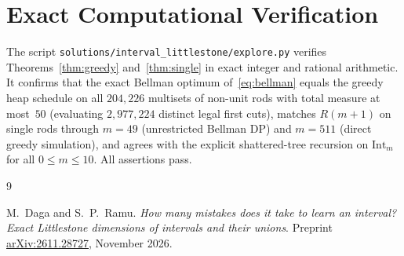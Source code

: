 \documentclass[11pt]{article}
\theoremstyle{plain}
\theoremstyle{definition}
\theoremstyle{remark}
\newcommand{\Int}{\mathrm{Int}}
\begin{document}
\section{Exact Computational Verification}

The script \texttt{solutions/interval\_littlestone/explore.py} verifies Theorems~\ref{thm:greedy} and~\ref{thm:single} in exact integer and rational arithmetic.
It confirms that the exact Bellman optimum of~\eqref{eq:bellman} equals the greedy heap schedule on all $204{,}226$ multisets of non-unit rods with total measure at most~$50$ (evaluating $2{,}977{,}224$ distinct legal first cuts), matches $R(m + 1)$ on single rods through $m = 49$ (unrestricted Bellman DP) and $m = 511$ (direct greedy simulation), and agrees with the explicit shattered-tree recursion on $\Int_m$ for all $0 \le m \le 10$. All assertions pass.

\begin{thebibliography}{9}

M.~Daga and S.~P.~Ramu.
\emph{How many mistakes does it take to learn an interval? Exact Littlestone dimensions of intervals and their unions}.
Preprint \href{https://arxiv.org/abs/2611.28727}{arXiv:2611.28727}, November 2026.

\end{thebibliography}
\end{document}
